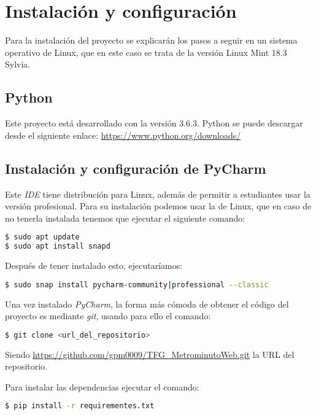 \section{Instalación y configuración}
Para la instalación del proyecto se explicarán los pasos a seguir en un sistema operativo de Linux, que en este caso se trata de la versión Linux Mint 18.3 Sylvia.

\subsection{Python}

Este proyecto está desarrollado con la versión 3.6.3. Python se puede descargar desde el siguiente enlace: 
\url{https://www.python.org/downloads/}

\subsection{Instalación y configuración de PyCharm}
Este \textit{IDE} tiene distribución para Linux, además de permitir a estudiantes usar la versión profesional. Para su instalación podemos usar la \cite{snap store} de Linux, que en caso de no tenerla instalada tenemos que ejecutar el siguiente comando:

\begin{lstlisting}[language=bash,caption={Instalar snapd}]
$ sudo apt update
$ sudo apt install snapd
\end{lstlisting}
Después de tener instalado esto, ejecutaríamos:
\begin{lstlisting}[language=bash,caption={Instalar PyCharm}]
$ sudo snap install pycharm-community|professional --classic
\end{lstlisting}

Una vez instalado \textit{PyCharm}, la forma más cómoda de obtener el código del proyecto es mediante \textit{git}, usando para ello el comando:
\begin{lstlisting}[language=bash,caption={Descargar el repositorio}]
$ git clone <url_del_repositorio>
\end{lstlisting}
Siendo \url{https://github.com/gpm0009/TFG_MetrominutoWeb.git} la URL del 
repositorio.

Para instalar las dependencias ejecutar el comando:
\begin{lstlisting}[language=bash,caption={Instalar requirements.txt}]
$ pip install -r requirementes.txt
\end{lstlisting}

